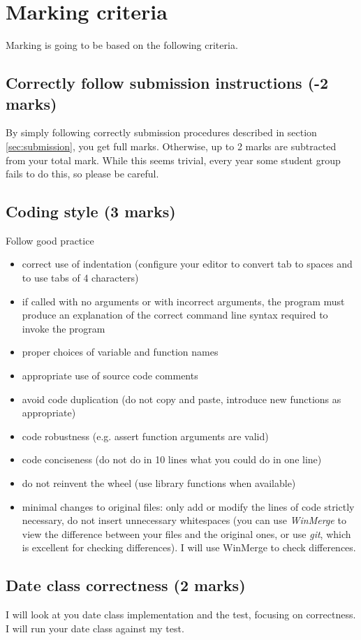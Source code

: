 \documentclass[10pt]{article}
\begin{document}
\section{Marking criteria}
Marking is going to be based on the following criteria.
\subsection{Correctly follow submission instructions (-2 marks)}
By simply following correctly submission procedures described in section \ref{sec:submission}, you get full marks. Otherwise, up to 2 marks are subtracted from your total mark. While this seems trivial, every year some student group fails to do this, so please be careful.
\subsection{Coding style (3 marks)}
Follow good practice
\begin{itemize}
\item correct use of indentation (configure your editor to convert tab to spaces and to use tabs of 4 characters)
\item if called with no arguments or with incorrect arguments, the program must produce an explanation of the correct command line syntax required to invoke the program
\item proper choices of variable and function names
\item appropriate use of source code comments
\item avoid code duplication (do not copy and paste, introduce new functions as appropriate)
\item code robustness (e.g. assert function arguments are valid)
\item code conciseness (do not do in 10 lines what you could do in one line)
\item do not reinvent the wheel (use library functions when available)
\item minimal changes to original files: only add or modify the lines of code strictly necessary, do not insert unnecessary whitespaces (you can use \textit{WinMerge} to view the difference between your files and the original ones, or use \textit{git}, which is excellent for checking differences). I will use WinMerge to check differences.
\end{itemize}

\subsection{Date class correctness (2 marks)}
I will look at you date class implementation and the test, focusing on correctness. I will run your date class against my test.
\end{document}
